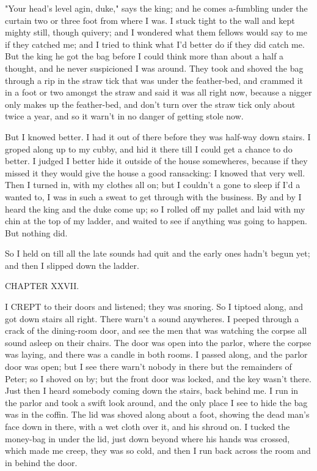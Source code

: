 "Your head's level agin, duke," says the king; and he comes a-fumbling
under the curtain two or three foot from where I was.  I stuck tight to
the wall and kept mighty still, though quivery; and I wondered what them
fellows would say to me if they catched me; and I tried to think what I'd
better do if they did catch me.  But the king he got the bag before I
could think more than about a half a thought, and he never suspicioned I
was around.  They took and shoved the bag through a rip in the straw tick
that was under the feather-bed, and crammed it in a foot or two amongst
the straw and said it was all right now, because a nigger only makes up
the feather-bed, and don't turn over the straw tick only about twice a
year, and so it warn't in no danger of getting stole now.

But I knowed better.  I had it out of there before they was half-way down
stairs.  I groped along up to my cubby, and hid it there till I could get
a chance to do better.  I judged I better hide it outside of the house
somewheres, because if they missed it they would give the house a good
ransacking:  I knowed that very well.  Then I turned in, with my clothes
all on; but I couldn't a gone to sleep if I'd a wanted to, I was in such
a sweat to get through with the business.  By and by I heard the king and
the duke come up; so I rolled off my pallet and laid with my chin at the
top of my ladder, and waited to see if anything was going to happen.  But
nothing did.

So I held on till all the late sounds had quit and the early ones hadn't
begun yet; and then I slipped down the ladder.




CHAPTER XXVII.

I CREPT to their doors and listened; they was snoring.  So I tiptoed
along, and got down stairs all right.  There warn't a sound anywheres.  I
peeped through a crack of the dining-room door, and see the men that was
watching the corpse all sound asleep on their chairs.  The door was open
into the parlor, where the corpse was laying, and there was a candle in
both rooms. I passed along, and the parlor door was open; but I see there
warn't nobody in there but the remainders of Peter; so I shoved on by;
but the front door was locked, and the key wasn't there.  Just then I
heard somebody coming down the stairs, back behind me.  I run in the
parlor and took a swift look around, and the only place I see to hide the
bag was in the coffin.  The lid was shoved along about a foot, showing
the dead man's face down in there, with a wet cloth over it, and his
shroud on.  I tucked the money-bag in under the lid, just down beyond
where his hands was crossed, which made me creep, they was so cold, and
then I run back across the room and in behind the door.

